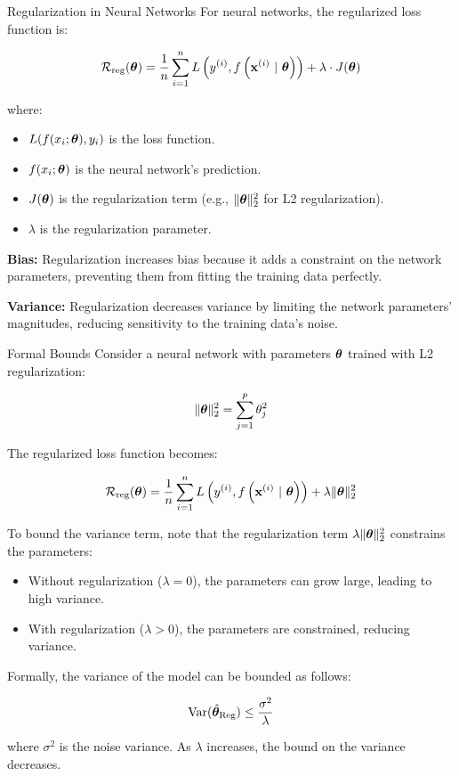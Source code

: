 \documentclass[11pt,compress,t,notes=noshow, xcolor=table]{beamer}
\begin{document}
\begin{vbframe}{Regularization in Neural Networks}
For neural networks, the regularized loss function is:

\[
\mathcal{R}_{\text{reg}}(\bm{\theta}) = \frac{1}{n} \sum_{i=1}^{n} L\left(y^{(i)}, f\left(\mathbf{x}^{(i)} ~|~ \bm{\theta}\right)\right) + \lambda \cdot J(\bm{\theta})
\]

where:

\begin{itemize}
    \item \( L(f(x_i; \bm{\theta}), y_i) \) is the loss function.
    \item \( f(x_i; \bm{\theta}) \) is the neural network's prediction.
    \item \( J(\bm{\theta}) \) is the regularization term (e.g., \( \|\bm{\theta}\|_2^2 \) for L2 regularization).
    \item \( \lambda \) is the regularization parameter.
\end{itemize}

\textbf{Bias:}
Regularization increases bias because it adds a constraint on the network parameters, preventing them from fitting the training data perfectly.

\textbf{Variance:}
Regularization decreases variance by limiting the network parameters' magnitudes, reducing sensitivity to the training data's noise.

\end{vbframe}

\begin{vbframe}{Formal Bounds}
Consider a neural network with parameters \(\bm{\theta}\) trained with L2 regularization:

\[
\|\bm{\theta}\|_2^2 = \sum_{j=1}^{p} \theta_j^2
\]

The regularized loss function becomes:

\[
\mathcal{R}_{\text{reg}}(\bm{\theta}) = \frac{1}{n} \sum_{i=1}^{n} L\left(y^{(i)}, f\left(\mathbf{x}^{(i)} ~|~ \bm{\theta}\right)\right) + \lambda \|\bm{\theta}\|_2^2
\]

To bound the variance term, note that the regularization term \( \lambda \|\bm{\theta}\|_2^2 \) constrains the parameters:

\begin{itemize}
    \item Without regularization (\(\lambda = 0\)), the parameters can grow large, leading to high variance.
    \item With regularization (\(\lambda > 0\)), the parameters are constrained, reducing variance.
\end{itemize}

Formally, the variance of the model can be bounded as follows:

\[
\text{Var}(\hat{\bm{\theta}}_{\text{Reg}}) \leq \frac{\sigma^2}{\lambda}
\]

where \(\sigma^2\) is the noise variance. As \(\lambda\) increases, the bound on the variance decreases.
\end{vbframe}
\end{document}
